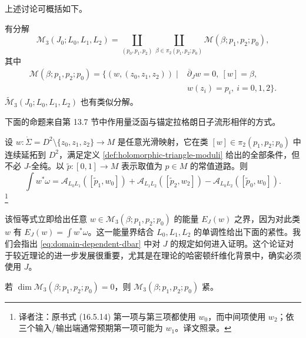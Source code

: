 上述讨论可概括如下。

\begin{proposition}
\label{prop:triangle-moduli-decomposition}
有分解
\[
 \mathcal M_3(J_0;L_0,L_1,L_2)
 =\coprod_{(p_0,p_1,p_2)}\coprod_{\beta\in\pi_2(p_1,p_2;p_0)}
 \mathcal M(\beta;p_1,p_2;p_0),
\]
其中
\[
 \begin{aligned}
 \mathcal M(\beta;p_1,p_2;p_0)=\{(w,(z_0,z_1,z_2))\mid{}&
 \overline\partial_Jw=0,\ [w]=\beta,\\[-2pt]
 &w(z_i)=p_i,\ i=0,1,2\}.
 \end{aligned}
\]
$\widetilde{\mathcal M}_3(J_0;L_0,L_1,L_2)$ 也有类似分解。
\end{proposition}

下面的命题来自第 13.7 节中作用量泛函与锚定拉格朗日子流形相伴的方式。

\begin{proposition}
\label{prop:triangle-area-action-identity}
设
$w:\dot\Sigma=D^2\setminus\{z_0,z_1,z_2\}\to M$ 是任意光滑映射，它在类
$[w]\in\pi_2(p_1,p_2;p_0)$ 中连续延拓到 $D^2$，满足定义
\ref{def:holomorphic-triangle-moduli} 给出的全部条件，但不必 $J$-全纯。以
$\widetilde p:[0,1]\to M$ 表示取值为 $p\in M$ 的常值道路。则
\begin{equation}
 \int w^*\omega
 =\mathcal A_{L_0L_1}([\widetilde p_1,w_0])
 +\mathcal A_{L_1L_2}([\widetilde p_2,w_2])
 -\mathcal A_{L_0L_2}([\widetilde p_0,w_0]).
\label{eq:triangle-area-action-identity}
\end{equation}
\footnote{译者注：原书式 (16.5.14) 第一项与第三项都使用 $w_0$，而中间项使用
$w_2$；依三个输入/输出端通常预期第一项可能为 $w_1$。译文照录。}
\end{proposition}

该恒等式立即给出任意 $w\in\mathcal M_3(\beta;p_1,p_2;p_0)$ 的能量
$E_J(w)$ 之界，因为对此类 $w$ 有 $E_J(w)=\int w^*\omega$。这一能量界结合
$L_0,L_1,L_2$ 的单调性给出下面的紧性。我们会指出
\eqref{eq:domain-dependent-dbar} 中对 $J$ 的规定如何进入证明。这个论证对于较近\personFloer{}理论的进一步发展很重要，尤其是在\personFloer{}理论的哈密顿纤维化背景中，确实必须使用\termDomainDependentFamily{} $J$。

\begin{corollary}
\label{cor:zero-dimensional-triangle-moduli-compact}
若 $\dim\mathcal M_3(\beta;p_1,p_2;p_0)=0$，则
$\mathcal M_3(\beta;p_1,p_2;p_0)$ 紧。
\end{corollary}

